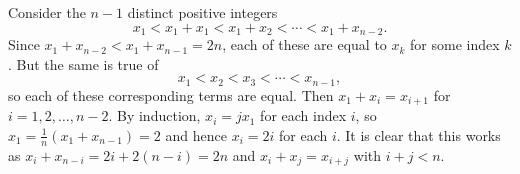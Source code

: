 Consider the $n-1$ distinct positive integers \[x_1<x_1+x_1<x_1+x_2<\cdots<x_1+x_{n-2}.\] Since $x_1+x_{n-2}<x_1+x_{n-1}=2n$, each of these are equal to $x_k$ for some index $k$. But the same is true of \[x_1<x_2<x_3<\cdots<x_{n-1},\] so each of these corresponding terms are equal. Then $x_1+x_i=x_{i+1}$ for $i=1,2,\ldots,n-2$. By induction, $x_i=jx_1$ for each index $i$, so $x_1=\frac{1}{n}\left(x_1+x_{n-1}\right)=2$ and hence $x_i=2i$ for each $i$. It is clear that this works as $x_i+x_{n-i}=2i+2\left(n-i\right)=2n$ and $x_i+x_j=x_{i+j}$ with $i+j<n$.